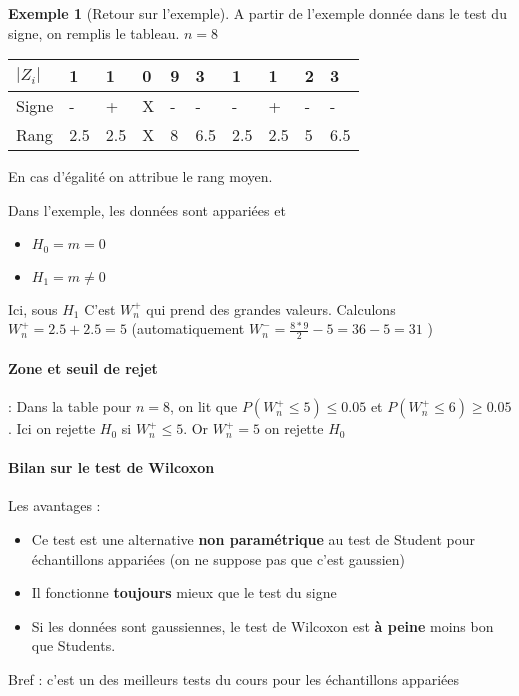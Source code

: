 \documentclass{article}
\theoremstyle{plain}%
\theoremstyle{definition}
\newtheorem{exmp}{Exemple}[section]
\theoremstyle{remark}
\begin{document}
\begin{exmp}[Retour sur l'exemple]
    A partir de l'exemple donnée dans le test du signe, on remplis le tableau. $ n=8 $ 

    \begin{table}[!h]
        \centering
        \begin{tabular}{|l|l|l|l|l|l|l|l|l|l|}
        \hline
            $ \left| Z_i \right|  $  & 1 & 1 & 0 & 9 & 3 & 1 & 1 & 2 & 3 \\ \hline
            Signe & -  & + & X & - & - & - & + & -  & - \\ \hline
            Rang & 2.5 & 2.5 & X & 8 & 6.5 & 2.5 & 2.5 & 5 & 6.5 \\ \hline
        \end{tabular}
    \end{table}

    En cas d'égalité on attribue le rang moyen. 

    Dans l'exemple, les données sont appariées et \begin{itemize}
        \item $ H_0 = m = 0 $ 
        \item $ H_1 = m \neq 0 $ 
    \end{itemize}
    Ici, sous $ H_1 $ C'est $ W_n^+ $ qui prend des grandes valeurs. Calculons $ W_n^+ = 2.5 + 2.5 = 5 $ (automatiquement $ W_n^- = \frac{8*9}{2} - 5 = 36 -  5 = 31 $ ) 

    \paragraph*{Zone et seuil de rejet} :
    Dans la table pour $ n=8 $, on lit que $ P(W_n^+ \leq 5) \leq 0.05 $ et $ P(W_n^+ \leq 6) \geq 0.05 $. Ici on rejette $ H_0 $ si $ W_n^+ \leq 5 $. Or $ W_n^+ = 5 $ on rejette $ H_0 $ 
\end{exmp}

\paragraph*{Bilan sur le test de Wilcoxon}

Les avantages : 
\begin{itemize}
    \item Ce test est une alternative \textbf{non paramétrique} au test de Student pour échantillons appariées (on ne suppose pas que c'est gaussien)
    \item Il fonctionne \textbf{toujours} mieux que le test du signe 
    \item Si les données sont gaussiennes, le test de Wilcoxon est \textbf{à peine} moins bon que Students.
\end{itemize}
Bref : c'est un des meilleurs tests du cours pour les échantillons appariées
\end{document}
